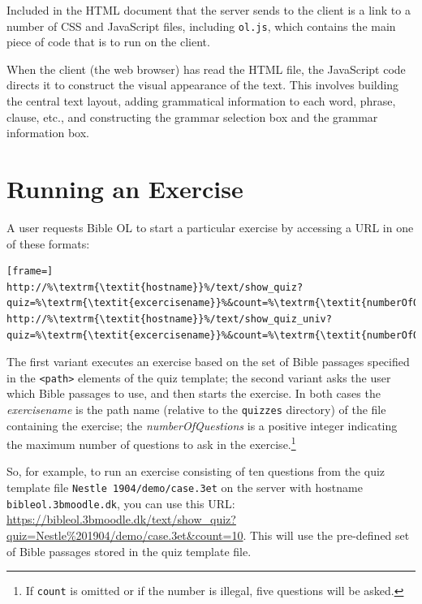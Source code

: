 \documentclass[11pt,oneside,a4paper]{memoir}
\newcommand*{\xml}[1]{\texttt{<#1>}}
\begin{document}
Included in the HTML document that the server sends to the client is a link to a number of CSS and
JavaScript files, including \texttt{ol.js}, which contains the main piece of code that is to run on
the client.

When the client (the web browser) has read the HTML file, the JavaScript code directs it to construct
the visual appearance of the text. This involves building the central text layout, adding
grammatical information to each word, phrase, clause, etc., and constructing the grammar selection
box and the grammar information box.

\section{Running an Exercise}

A user requests Bible OL to start a particular exercise by accessing a URL%
in one of these formats:

\begin{lstlisting}[frame=]
http://%\textrm{\textit{hostname}}%/text/show_quiz?quiz=%\textrm{\textit{excercisename}}%&count=%\textrm{\textit{numberOfQuestions}}%
http://%\textrm{\textit{hostname}}%/text/show_quiz_univ?quiz=%\textrm{\textit{excercisename}}%&count=%\textrm{\textit{numberOfQuestions}}%
\end{lstlisting}

The first variant executes an exercise based on the set of Bible passages specified in the
\xml{path} elements of the quiz template; the second variant asks the user
which Bible passages to use, and then starts the exercise. In both cases the \emph{exercisename} is
the path name (relative to the \texttt{quizzes} directory) of the file containing the exercise; the
\emph{numberOfQuestions} is a positive integer indicating the maximum number of questions to ask in
the exercise.\footnote{If \texttt{count} is omitted or if the number is illegal, five questions will
  be asked.}

So, for example, to run an exercise consisting of ten questions from the quiz template file
\texttt{Nestle~1904/demo/case.3et} on the server with hostname \texttt{bibleol.3bmoodle.dk}, you can
use this URL:
\url{https://bibleol.3bmoodle.dk/text/show_quiz?quiz=Nestle\%201904/demo/case.3et&count=10}. This
will use the pre-defined set of Bible passages stored in the quiz template file.
\end{document}
